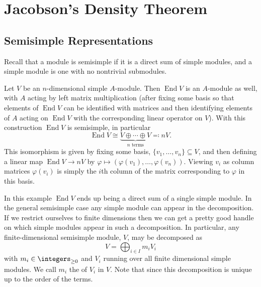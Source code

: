 \documentclass[fleqn]{NotesClass}
\DeclareMathOperator{\End}{End}
\newcommand{\isomorphic}{\cong}
\begin{document}
    \chapter{Jacobson's Density Theorem}
    \section{Semisimple Representations}
    Recall that a module is semisimple if it is a direct sum of simple modules, and a simple module is one with no nontrivial submodules.
    
    \begin{exm}{}{}
        Let \(V\) be an \(n\)-dimensional simple \(A\)-module.
        Then \(\End V\) is an \(A\)-module as well, with \(A\) acting by left matrix multiplication (after fixing some basis so that elements of \(\End V\) can be identified with matrices and then identifying elements of \(A\) acting on \(\End V\) with the corresponding linear operator on \(V\)).
        With this construction \(\End V\) is semisimple, in particular
        \begin{equation}
            \End V \isomorphic \underbrace{V \oplus \dotsb \oplus V}_{n \text{ terms}} \eqcolon nV.
        \end{equation}
        This isomorphism is given by fixing some basis, \(\{v_1, \dotsc, v_n\} \subseteq V\), and then defining a linear map \(\End V \to nV\) by \(\varphi \mapsto (\varphi(v_1), \dotsc, \varphi(v_n))\).
        Viewing \(v_i\) as column matrices \(\varphi(v_i)\) is simply the \(i\)th column of the matrix corresponding to \(\varphi\) in this basis.
    \end{exm}
    
    In this example \(\End V\) ends up being a direct sum of a single simple module.
    In the general semisimple case any simple module can appear in the decomposition.
    If we restrict ourselves to finite dimensions then we can get a pretty good handle on which simple modules appear in such a decomposition.
    In particular, any finite-dimensional semisimple module, \(V\), may be decomposed as
    \begin{equation}
        V = \bigoplus_{i \in I} m_i V_i
    \end{equation}
    with \(m_i \in \integers_{\ge 0}\) and \(V_i\) running over all finite dimensional simple modules.
    We call \(m_i\) the  of \(V_i\) in \(V\).
    Note that since this decomposition is unique up to the order of the terms.
    
\end{document}
